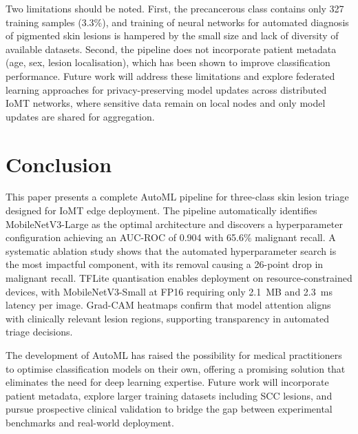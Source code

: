\documentclass[conference]{IEEEtran}
\begin{document}
Two limitations should be noted. First, the precancerous class contains only 327 training samples (3.3\%), and training of neural networks for automated diagnosis of pigmented skin lesions is hampered by the small size and lack of diversity of available datasets. Second, the pipeline does not incorporate patient metadata (age, sex, lesion localisation), which has been shown to improve classification performance. Future work will address these limitations and explore federated learning approaches for privacy-preserving model updates across distributed IoMT networks, where sensitive data remain on local nodes and only model updates are shared for aggregation.
 
\section{Conclusion}
 
This paper presents a complete AutoML pipeline for three-class skin lesion triage designed for IoMT edge deployment. The pipeline automatically identifies MobileNetV3-Large as the optimal architecture and discovers a hyperparameter configuration achieving an AUC-ROC of 0.904 with 65.6\% malignant recall. A systematic ablation study shows that the automated hyperparameter search is the most impactful component, with its removal causing a 26-point drop in malignant recall. TFLite quantisation enables deployment on resource-constrained devices, with MobileNetV3-Small at FP16 requiring only 2.1~MB and 2.3~ms latency per image. Grad-CAM heatmaps confirm that model attention aligns with clinically relevant lesion regions, supporting transparency in automated triage decisions.
 
The development of AutoML has raised the possibility for medical practitioners to optimise classification models on their own, offering a promising solution that eliminates the need for deep learning expertise. Future work will incorporate patient metadata, explore larger training datasets including SCC lesions, and pursue prospective clinical validation to bridge the gap between experimental benchmarks and real-world deployment.
\end{document}
